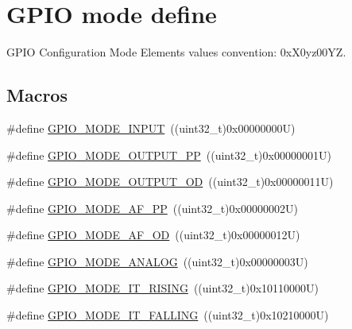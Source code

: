 \hypertarget{group___g_p_i_o__mode__define}{}\section{G\+P\+IO mode define}
\label{group___g_p_i_o__mode__define}


G\+P\+IO Configuration Mode Elements values convention\+: 0x\+X0yz00\+YZ.  


\subsection*{Macros}
\begin{DoxyCompactItemize}
\item 
\#define \mbox{\hyperlink{group___g_p_i_o__mode__define_gaf40bec3146810028a84b628d37d3b391}{G\+P\+I\+O\+\_\+\+M\+O\+D\+E\+\_\+\+I\+N\+P\+UT}}~((uint32\+\_\+t)0x00000000\+U)
\item 
\#define \mbox{\hyperlink{group___g_p_i_o__mode__define_ga1013838a64cec2f8c88f079c449d1982}{G\+P\+I\+O\+\_\+\+M\+O\+D\+E\+\_\+\+O\+U\+T\+P\+U\+T\+\_\+\+PP}}~((uint32\+\_\+t)0x00000001\+U)
\item 
\#define \mbox{\hyperlink{group___g_p_i_o__mode__define_ga2f91757829f6e9505ec386b840941929}{G\+P\+I\+O\+\_\+\+M\+O\+D\+E\+\_\+\+O\+U\+T\+P\+U\+T\+\_\+\+OD}}~((uint32\+\_\+t)0x00000011\+U)
\item 
\#define \mbox{\hyperlink{group___g_p_i_o__mode__define_ga526c72c5264316fc05c775b6cad4aa6a}{G\+P\+I\+O\+\_\+\+M\+O\+D\+E\+\_\+\+A\+F\+\_\+\+PP}}~((uint32\+\_\+t)0x00000002\+U)
\item 
\#define \mbox{\hyperlink{group___g_p_i_o__mode__define_ga282b9fd37c8ef31daba314ffae6bf023}{G\+P\+I\+O\+\_\+\+M\+O\+D\+E\+\_\+\+A\+F\+\_\+\+OD}}~((uint32\+\_\+t)0x00000012\+U)
\item 
\#define \mbox{\hyperlink{group___g_p_i_o__mode__define_ga7a04f9ab65ad572ad20791a35009220c}{G\+P\+I\+O\+\_\+\+M\+O\+D\+E\+\_\+\+A\+N\+A\+L\+OG}}~((uint32\+\_\+t)0x00000003\+U)
\item 
\#define \mbox{\hyperlink{group___g_p_i_o__mode__define_ga088659562e68426d9a72821ea4fd8d50}{G\+P\+I\+O\+\_\+\+M\+O\+D\+E\+\_\+\+I\+T\+\_\+\+R\+I\+S\+I\+NG}}~((uint32\+\_\+t)0x10110000\+U)
\item 
\#define \mbox{\hyperlink{group___g_p_i_o__mode__define_gaa166210a6da3ac7e8d7504702520e522}{G\+P\+I\+O\+\_\+\+M\+O\+D\+E\+\_\+\+I\+T\+\_\+\+F\+A\+L\+L\+I\+NG}}~((uint32\+\_\+t)0x10210000\+U)
\item 

\end{DoxyCompactItemize}
